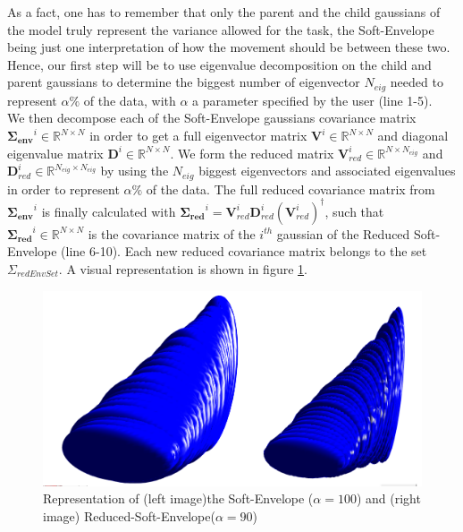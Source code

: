 \documentclass[letterpaper, 10 pt, conference]{ieeeconf}  %
\newcommand{\mb}[1]{{\boldsymbol{#1}}}
\newcommand{\psin}{{\!\dagger}}
\begin{document}
As a fact, one has to remember that only the parent and the child gaussians of the model truly represent the variance allowed for the task, the Soft-Envelope being just one interpretation of how the movement should be between these two. Hence, our first step will be to use eigenvalue decomposition on the child and parent gaussians to determine the biggest number of eigenvector $N_{eig}$ needed to represent $\alpha \%$ of the data, with $\alpha$ a parameter specified by the user (line 1-5). \\
We then decompose each of the Soft-Envelope gaussians covariance matrix $\mb{\Sigma_{env}}^i \in \mathbb{R}^{N \times N}$  in order to get a full eigenvector matrix $\mb{V}^{i} \in \mathbb{R}^{N \times N}$ and diagonal eigenvalue matrix $\mb{D}^{i} \in \mathbb{R}^{N \times N}$. We form the reduced  matrix $\mb{V}_{red}^{i}\in \mathbb{R}^{N \times N_{eig}}$ and $\mb{D}_{red}^{i} \in \mathbb{R}^{N_{eig} \times N_{eig}}$  by using the $N_{eig}$ biggest eigenvectors and associated eigenvalues in order to represent $\alpha \%$ of the data.
The full reduced covariance matrix from $\mb{\Sigma_{env}}^{i}$ is finally calculated with $\mb{\Sigma_{red}}^{i} =\mb{V}_{red}^{i} \mb{D}_{red}^{i}  (\mb{V}_{red}^{i})^{\psin}$, such that $\mb{\Sigma_{red}}^{i}  \in \mathbb{R}^{N \times N} $  is the covariance matrix of the $i^{th}$ gaussian of the Reduced Soft-Envelope (line 6-10). Each new reduced covariance matrix belongs to the set $\Sigma_{redEnvSet}$. A visual representation is shown in figure \ref{100vs90EnvOnly}.
\begin{figure}[h]
	\centering
	\includegraphics[scale=0.21]{figure/100vs90EnvOnly.png}
	\caption{Representation of (left image)the Soft-Envelope ($\alpha = 100$) and (right image) Reduced-Soft-Envelope($\alpha = 90$)}
	\label{100vs90EnvOnly}
\end{figure}
\end{document}
